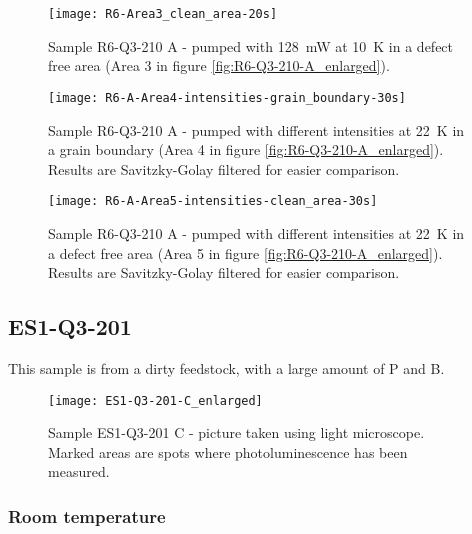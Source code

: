 \begin{figure}[H]
\centering
\texttt{[image: R6-Area3\_clean\_area-20s]}
\caption[R6-Q3-210 at a defect free area]{Sample R6-Q3-210 A - pumped with 128~mW at 10~K in a defect free area (Area 3 in figure \ref{fig:R6-Q3-210-A_enlarged}).}
\label{fig:R6-Area3_clean_area-20s}%
\end{figure}


\begin{figure}[H]
\centering
\texttt{[image: R6-A-Area4-intensities-grain\_boundary-30s]}
\caption[R6-Q3-210 at a grain boundary]{Sample R6-Q3-210 A - pumped with different intensities at 22~K in a grain boundary (Area 4 in figure \ref{fig:R6-Q3-210-A_enlarged}). Results are Savitzky-Golay filtered for easier comparison.}
\label{fig:R6-A-Area4-intensities-grain_boundary-30s}%
\end{figure}


\begin{figure}[H]
\centering
\texttt{[image: R6-A-Area5-intensities-clean\_area-30s]}
\caption[R6-Q3-210 at a defect free area]{Sample R6-Q3-210 A - pumped with different intensities at 22~K in a defect free area (Area 5 in figure \ref{fig:R6-Q3-210-A_enlarged}). Results are Savitzky-Golay filtered for easier comparison.}
\label{fig:R6-A-Area5-intensities-clean_area-30s}%
\end{figure}








\subsection{ES1-Q3-201}

This sample is from a dirty feedstock, with a large amount of P and B.


\begin{figure}[H]
\centering
\texttt{[image: ES1-Q3-201-C\_enlarged]}
\caption[ES1-Q3-201 C from light microscope]{Sample ES1-Q3-201 C - picture taken using light microscope. Marked areas are spots where photoluminescence has been measured.}
\label{fig:ES1-Q3-201-C_enlarged}%
\end{figure}

\subsubsection{Room temperature}

